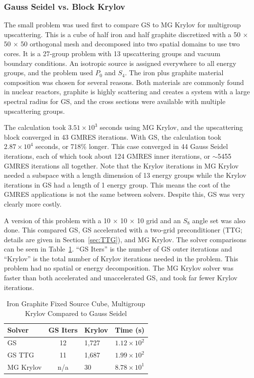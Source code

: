 \subsubsection{Gauss Seidel vs. Block Krylov}
The small problem was used first to compare GS to MG Krylov for multigroup upscattering. This is a cube of half iron and half graphite discretized with a 50 $\times$ 50 $\times$ 50 orthogonal mesh and decomposed into two spatial domains to use two cores. It is a 27-group problem with 13 upscattering groups and vacuum boundary conditions. An isotropic source is assigned everywhere to all energy groups, and the problem used $P_0$ and $S_4$. The iron plus graphite material composition was chosen for several reasons. Both materials are commonly found in nuclear reactors, graphite is highly scattering and creates a system with a large spectral radius for GS, and the cross sections were available with multiple upscattering groups.

The calculation took $3.51 \times 10^{3}$ seconds using MG Krylov, and the upscattering block converged in 43 GMRES iterations. With GS, the calculation took $2.87 \times 10^{4}$ seconds, or 718\% longer. This case converged in 44 Gauss Seidel iterations, each of which took about 124 GMRES inner iterations, or $\sim$5455 GMRES iterations all together. Note that the Krylov iterations in MG Krylov needed a subspace with a length dimension of 13 energy groups while the Krylov iterations in GS had a length of 1 energy group. This means the cost of the GMRES applications is not the same between solvers. Despite this, GS was very clearly more costly.

A version of this problem with a 10 $\times$ 10 $\times$ 10 grid and an $S_{8}$ angle set was also done. This compared GS, GS accelerated with a two-grid preconditioner (TTG; details are given in Section~\ref{sec:TTG}), and MG Krylov. The solver comparisons can be seen in Table~\ref{table:FeC GS Krylov}. ``GS Iters'' is the number of GS outer iterations and ``Krylov'' is the total number of Krylov iterations needed in the problem. This problem had no spatial or energy decomposition. The MG Krylov solver was faster than both accelerated and unaccelerated GS, and took far fewer Krylov iterations. 
%
\begin{table}[!h]
\caption{Iron Graphite Fixed Source Cube, Multigroup Krylov Compared to Gauss Seidel}
\begin{center}
\begin{tabular}{| l | c | l | c |}
\hline
Solver & GS Iters & Krylov & Time (s)\\[0.5ex]
\hline
GS &  12 & 1,727 & $1.12 \times 10^{2}$ \\
GS TTG & 11 & 1,687 & $1.99 \times 10^{2}$  \\
MG Krylov & n/a & 30 & $8.78 \times 10^{1}$ \\
\hline
\end{tabular}
\end{center}
\label{table:FeC GS Krylov}
\end{table}

